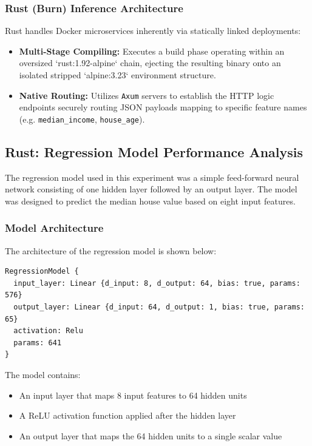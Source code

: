 \documentclass[10pt,a4paper,twocolumn]{article}
\begin{document}
\subsubsection{Rust (Burn) Inference Architecture}
Rust handles Docker microservices inherently via statically linked deployments:
\begin{itemize}
    \item \textbf{Multi-Stage Compiling:} Executes a build phase operating within an oversized `rust:1.92-alpine` chain, ejecting the resulting binary onto an isolated stripped `alpine:3.23` environment structure.
    \item \textbf{Native Routing:} Utilizes \texttt{Axum} servers to establish the HTTP logic endpoints securely routing JSON payloads mapping to specific feature names (e.g. \texttt{median\_income}, \texttt{house\_age}).
\end{itemize}

\subsection{Rust: Regression Model Performance Analysis}

The regression model used in this experiment was a simple feed-forward neural network consisting of one hidden layer followed by an output layer. The model was designed to predict the median house value based on eight input features.

\subsubsection{Model Architecture}

The architecture of the regression model is shown below:

\begin{verbatim}
RegressionModel {
  input_layer: Linear {d_input: 8, d_output: 64, bias: true, params: 576}
  output_layer: Linear {d_input: 64, d_output: 1, bias: true, params: 65}
  activation: Relu
  params: 641
}
\end{verbatim}

The model contains:

\begin{itemize}
    \item An input layer that maps 8 input features to 64 hidden units
    \item A ReLU activation function applied after the hidden layer
    \item An output layer that maps the 64 hidden units to a single scalar value
\end{itemize}
\end{document}
